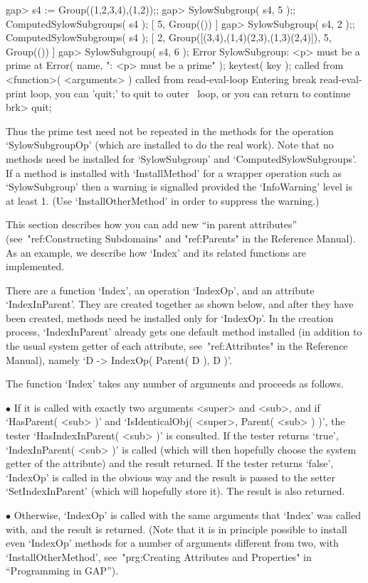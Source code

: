 \beginexample
gap> s4 := Group((1,2,3,4),(1,2));;
gap> SylowSubgroup( s4, 5 );;  ComputedSylowSubgroups( s4 );
[ 5, Group(()) ]
gap> SylowSubgroup( s4, 2 );;  ComputedSylowSubgroups( s4 );
[ 2, Group([(3,4),(1,4)(2,3),(1,3)(2,4)]), 5, Group(()) ]
\endexample
\begintt
gap> SylowSubgroup( s4, 6 );                                
Error SylowSubgroup: <p> must be a prime at
Error( name, ": <p> must be a prime" );
keytest( key ); called from
<function>( <arguments> ) called from read-eval-loop
Entering break read-eval-print loop, you can 'quit;' to quit to outer \
loop,
or you can return to continue
brk> quit;
\endtt

Thus the prime test need not be repeated in the methods for the operation
`SylowSubgroupOp' (which are installed to do the real work).
Note that no methods need be installed for `SylowSubgroup' and
`ComputedSylowSubgroups'.
If a method is installed with `InstallMethod' for a wrapper operation
such as `SylowSubgroup' then a warning is signalled
provided the `InfoWarning' level is at least 1.
(Use `InstallOtherMethod' in order to suppress the warning.)


\Section{In Parent Attributes}

This section describes how you can add  new ``in parent attributes''
(see~"ref:Constructing Subdomains" and "ref:Parents" in the Reference Manual).
As an example, we describe how `Index' and its related functions
are implemented.

There are a function `Index', an operation `IndexOp', and an attribute
`IndexInParent'.
They are created together as shown below,
and after they have been created,
methods need be installed only for `IndexOp'.
In the creation process, `IndexInParent' already gets one default method
installed
(in addition to the usual system getter of each attribute,
see~"ref:Attributes" in the Reference Manual),
namely `D -> IndexOp( Parent( D ), D )'.

The function `Index' takes any number of arguments and proceeds as
follows.
\beginlist
\item{$\bullet$}
  If it is called  with exactly two arguments  <super> and <sub>,  and if
  `HasParent( <sub> )' and  `IsIdenticalObj( <super>, Parent( <sub> ) )',
  the tester `HasIndexInParent( <sub> )' is consulted.
  \itemitem{$\circ$}
    If  the  tester returns `true',  `IndexInParent(  <sub> )'  is called
    (which will then hopefully choose the system getter of the attribute)
    and the result returned.
  \itemitem{$\circ$}
    If the tester returns `false', `IndexOp' is called in the obvious way
    and the result is passed to the setter `SetIndexInParent' (which will
    hopefully store it). The result is also returned.
\item{$\bullet$}
  Otherwise, `IndexOp' is called with the same arguments that `Index' was
  called with, and the result is returned.
  (Note that it is in principle possible to install even `IndexOp' methods
  for a number of arguments different from two, with `InstallOtherMethod',
  see~"prg:Creating Attributes and Properties" in ``Programming in GAP'').
\endlist

